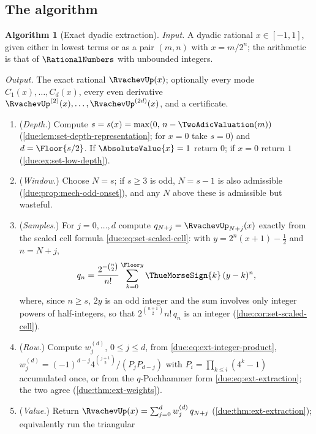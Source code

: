 \documentclass[11pt,oneside]{article}
\theoremstyle{plain}
\theoremstyle{definition}
\newtheorem{algorithm}[theorem]{Algorithm}
\theoremstyle{remark}
\newcommand{\upn}[1]{\RvachevUp_{#1}}
\newcommand{\dep}[1]{s\!\left(#1\right)}                    %
\newcommand{\Cr}[2]{C_{#1}\!\left(#2\right)}                %
\newcommand{\qn}[1]{q_{#1}}                                 %
\newcommand{\Wrow}[2]{w^{(#1)}_{#2}}                        %
\begin{document}
\subsection{The algorithm}
\label{due:sec:alg-algorithm}

\begin{algorithm}[Exact dyadic extraction]
\label{due:alg:exr-extraction}
\emph{Input.}  A dyadic rational $x\in[-1,1]$, given either in lowest terms
or as a pair $(m,n)$ with $x=m/2^{n}$; the arithmetic is that of
$\RationalNumbers$ with unbounded integers.

\emph{Output.}  The exact rational $\RvachevUp(x)$; optionally every mode
$\Cr{1}{x},\ldots,\Cr{d}{x}$, every even derivative
$\RvachevUp^{(2)}(x),\ldots,\RvachevUp^{(2d)}(x)$, and a certificate.

\begin{enumerate}[label=\textup{\arabic*.}]
\item\label{due:it:alg-depth}
 (\emph{Depth.})  Compute $s=\dep{x}=\max(0,\,n-\TwoAdicValuation(m))$
 (\cref{due:lem:set-depth-representation}; for $x=0$ take $s=0$) and
 $d=\Floor{s/2}$.  If $\AbsoluteValue{x}=1$ return $0$; if $x=0$ return $1$
 (\cref{due:ex:set-low-depth}).
\item\label{due:it:alg-level}
 (\emph{Window.})  Choose $N=s$; if $s\ge3$ is odd, $N=s-1$ is also
 admissible (\cref{due:prop:mech-odd-onset}), and any $N$ above these is
 admissible but wasteful.
\item\label{due:it:alg-samples}
 (\emph{Samples.})  For $j=0,\ldots,d$ compute $\qn{N+j}=\upn{N+j}(x)$
 exactly from the scaled cell formula \cref{due:eq:set-scaled-cell}: with
 $y=2^{n}(x+1)-\tfrac12$ and $n=N+j$,
 \[
  \qn{n}=\frac{2^{-\binom n2}}{n!}\sum_{k=0}^{\Floor y}\ThueMorseSign{k}\,(y-k)^{n},
 \]
 where, since $n\ge s$, $2y$ is an odd integer and the sum involves only
 integer powers of half-integers, so that $2^{\binom{n+1}{2}}n!\,\qn{n}$ is
 an integer (\cref{due:cor:set-scaled-cell}).
\item\label{due:it:alg-weights}
 (\emph{Row.})  Compute $\Wrow{d}{j}$, $0\le j\le d$, from
 \cref{due:eq:ext-integer-product},
 $\Wrow{d}{j}=(-1)^{d-j}4^{\binom{j+1}{2}}/(P_{j}P_{d-j})$ with
 $P_{i}=\prod_{k\le i}(4^{k}-1)$ accumulated once, or from the
 $q$-Pochhammer form \cref{due:eq:ext-extraction}; the two agree
 (\cref{due:thm:ext-weights}).
\item\label{due:it:alg-value}
 (\emph{Value.})  Return $\RvachevUp(x)=\sum_{j=0}^{d}\Wrow{d}{j}\,\qn{N+j}$
 (\cref{due:thm:ext-extraction}); equivalently run the triangular

\end{enumerate}
\end{algorithm}
\end{document}
